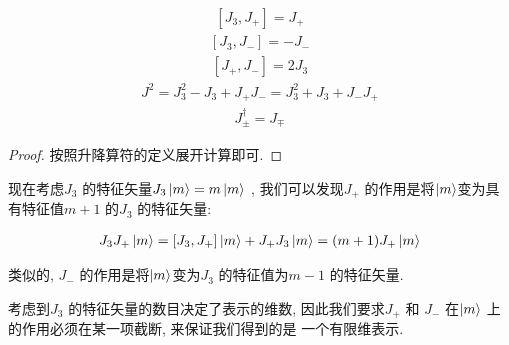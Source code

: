 \begin{property}
  \begin{enumerate}
    \Item \begin{equation}
      \begin{aligned}
        [J_3, J_{+}] = J_{+}
      \end{aligned}
    \end{equation}
  \Item \begin{equation}
    \begin{aligned}
      [J_3, J_{-}] = -J_{-}
    \end{aligned}
    \end{equation}
  \Item \begin{equation}
    \begin{aligned}
      [J_{+}, J_{-}] = 2 J_3
    \end{aligned}
  \end{equation}
  \Item \begin{equation}\label{eq:j^2_expansion}
    \begin{aligned}
      J^{2} = J_3^{2} - J_3 + J_{+}J_{-} = J_3^{2} + J_3 + J_{-}J_{+}
    \end{aligned}
  \end{equation}
  \Item \begin{equation}\label{eq:j_pm_conj}
    \begin{aligned}
      J_{\pm}^{\dagger} = J_{\mp}
    \end{aligned}
  \end{equation}
  \end{enumerate}
\end{property}
\begin{proof}
  按照升降算符的定义展开计算即可.
\end{proof}

现在考虑$J_3$ 的特征矢量$J_3\ket{m}=m \ket{m}$ ,
我们可以发现$J_{+}$ 的作用是将$\ket{m}$变为具有特征值$m+1$ 的$J_3$ 的特征矢量:

\begin{equation}
  \begin{aligned}
    J_3 J_{+} \ket{m} = [J_3, J_{+}]\ket{m} + J_{+} J_3 \ket{m} = (m+1) J_{+}\ket{m}
  \end{aligned}
\end{equation}

类似的, $J_{-}$ 的作用是将$ \ket{m}$变为$J_3$ 的特征值为$m-1$ 的特征矢量.

考虑到$J_3$ 的特征矢量的数目决定了表示的维数, 因此我们要求$J_{+}$ 和
$J_{-}$ 在$\ket{m}$ 上的作用必须在某一项截断, 来保证我们得到的是
一个有限维表示.

